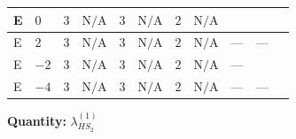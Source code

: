 \documentclass[8pt]{article}
\begin{document}
\begin{landscape}
\begin{longtable}{@{}llcccccc >{\raggedright\arraybackslash}p{0.21\linewidth} >{\raggedright\arraybackslash}p{0.21\linewidth} >{\raggedright\arraybackslash}p{0.21\linewidth}@{}}
\midrule
E & $0$ & $3$ & $\text{N/A}$ & $3$ & $\text{N/A}$ & $2$ & $\text{N/A}$ & \scriptsize\adjustbox{max width=\linewidth}{$\begin{gathered} +12 {\lambda_{X_{5}}^{(1)}} \left({\lambda_{X_{18}}}\right)^{*} \\ +4 {\lambda_{X_{5}}^{(2)}} \left({\lambda_{X_{18}}}\right)^{*}\end{gathered}$} & \scriptsize\adjustbox{max width=\linewidth}{$\begin{gathered} +4 {\lambda_{X_{14}}} \left({\lambda_{X_{14}}}\right)^{*}\end{gathered}$} & \scriptsize\adjustbox{max width=\linewidth}{$\begin{gathered} +6 {g_2}^4\end{gathered}$} \\
\midrule
E & $2$ & $3$ & $\text{N/A}$ & $3$ & $\text{N/A}$ & $2$ & $\text{N/A}$ & --- & --- & \scriptsize\adjustbox{max width=\linewidth}{$\begin{gathered} +6 {g_2}^4\end{gathered}$} \\
\midrule
E & $-2$ & $3$ & $\text{N/A}$ & $3$ & $\text{N/A}$ & $2$ & $\text{N/A}$ & --- & \scriptsize\adjustbox{max width=\linewidth}{$\begin{gathered} +4 {\lambda_{X_{12}}} \left({\lambda_{X_{12}}}\right)^{*}\end{gathered}$} & \scriptsize\adjustbox{max width=\linewidth}{$\begin{gathered} +6 {g_2}^4\end{gathered}$} \\
\midrule
E & $-4$ & $3$ & $\text{N/A}$ & $3$ & $\text{N/A}$ & $2$ & $\text{N/A}$ & --- & --- & \scriptsize\adjustbox{max width=\linewidth}{$\begin{gathered} +6 {g_2}^4\end{gathered}$} \\
\midrule
\bottomrule
\end{longtable}
\clearpage
\noindent\textbf{Quantity: }$\lambda_{HS_2}^{(1)}$\par\smallskip

\end{landscape}
\end{document}
